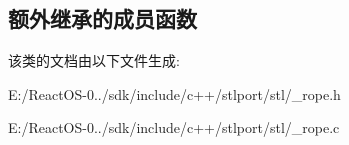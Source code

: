 \subsection*{额外继承的成员函数}


该类的文档由以下文件生成\+:\begin{DoxyCompactItemize}
\item 
E\+:/\+React\+O\+S-\/0../sdk/include/c++/stlport/stl/\+\_\+rope.\+h\item 
E\+:/\+React\+O\+S-\/0../sdk/include/c++/stlport/stl/\+\_\+rope.\+c\end{DoxyCompactItemize}
